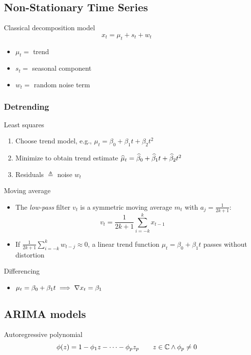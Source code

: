 \documentclass[landscape]{article}
\begin{document}
\begin{multicols*}{2}
\subsection{Non-Stationary Time Series}

Classical decomposition model
\[x_t = \mu_t + s_t + w_t\]
\begin{itemize}
  \item $\mu_t =$ trend
  \item $s_t =$ seasonal component
  \item $w_t =$ random noise term
\end{itemize}

\subsubsection{Detrending}

Least squares
\begin{enumerate}
  \item Choose trend model, e.g.,
    $\mu_t = \beta_0 + \beta_1 t + \beta_2 t^2$
  \item Minimize \rss to obtain trend estimate
    $\widehat{\mu}_t = \widehat{\beta}_0 + \widehat{\beta}_1 t + \widehat{\beta}_2 t^2$
  \item Residuals $\triangleq$ noise $w_t$
\end{enumerate}

Moving average
\begin{itemize}
  \item The \emph{low-pass} filter $v_t$ is a symmetric moving average $m_t$
    with $a_j = \frac{1}{2k+1}$:
    \[v_t = \frac{1}{2k+1} \sum_{i=-k}^k x_{t-1}\]
  \item If $\frac{1}{2k+1} \sum_{i=-k}^k w_{t-j} \approx 0$,
    a linear trend function $\mu_t = \beta_0 + \beta_1t$ passes without
    distortion
\end{itemize}

Differencing
\begin{itemize}
  \item $\mu_t = \beta_0 + \beta_1t \;\Longrightarrow\; \nabla x_t = \beta_1$
\end{itemize}

\subsection{ARIMA models}

Autoregressive polynomial
\[\phi(z) = 1 - \phi_1 z - \cdots - \phi_p z_p
\qquad z \in \mathbb{C} \wedge \phi_p \neq 0\]


\end{multicols*}
\end{document}
